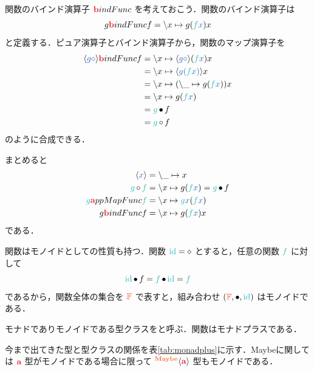 \documentclass[a5paper,twoside,fleqn,draft]{jsbook}
\begin{document}
関数のバインド演算子 $\hTypeName{b}indFunc$ を考えておこう．関数のバインド演算子は
\begin{equation}
g\hTypeName{b}indFunc f=\hLambdaSyntax{x}{g(\hFunc{f}\hVar{x})x}
\end{equation}
と定義する．ピュア演算子とバインド演算子から，関数のマップ演算子を
\begin{align}
\mConstWith{g\hAnonParam}\hTypeName{b}indFunc f
&=\hLambdaSyntax{x}{\mConstWith{g\hAnonParam}(\hFunc{f}\hVar{x})x}\\
&=\hLambdaSyntax{x}{\mConstWith{g(\hFunc{f}\hVar{x})}x}\\
&=\hLambdaSyntax{x}{(\hLambdaSyntax{\_}{g(\hFunc{f}\hVar{x})})x}\\
&=\hLambdaSyntax{x}{g(\hFunc{f}\hVar{x})}\\
&=\hFunc{g}\hCompose f\\
&=\hFunc{g}\mMapFunc f
\end{align}
のように合成できる．

まとめると
\begin{align}
\mConstWith{x}&=\hLambdaSyntax{\_}{x}\\
\hFunc{g}\mMapFunc\hFunc{f}&=\hLambdaSyntax{x}{g(\hFunc{f}\hVar{x})}=\hFunc{g}\hCompose f\\
\hFunc{g}\hTypeName{a}ppMapFunc\hFunc{f}&=\hLambdaSyntax{x}{\hFunc{g}\hVar{x}(\hFunc{f}\hVar{x})}\\
g\hTypeName{b}indFunc f&=\hLambdaSyntax{x}{g(\hFunc{f}\hVar{x})x}
\end{align}
である．


\separator

関数はモノイドとしての性質も持つ．関数 $\mId=\hAnonParam$ とすると，任意の関数 $\hFunc{f}$ に対して
\begin{equation}
\mId\hCompose f=\hFunc{f}\hCompose\mId=\hFunc{f}
\end{equation}
であるから，関数全体の集合を $\mFSet$ で表すと，組み合わせ $(\mFSet,\hCompose,\mId)$ はモノイドである．

モナドでありモノイドである型クラスをと呼ぶ．関数はモナドプラスである．

今まで出てきた型と型クラスの関係を表\ref{tab:monadplus}に示す．Maybeに関しては $\hTypeName{a}$ 型がモノイドである場合に限って $\hMaybeConstruct{\hTypeName{a}}$ 型もモノイドである．
\end{document}
